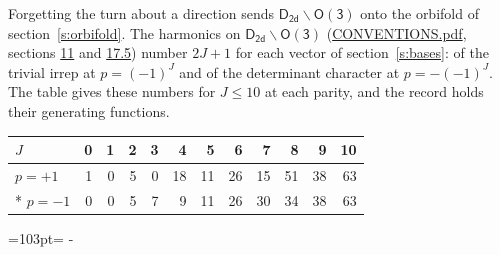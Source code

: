 \documentclass[10pt,a4paper]{article}
\newcommand{\needspace}[1]{\par\penalty-100\begingroup\dimen0=#1\relax\dimen2=\pagegoal
  \advance\dimen2-\pagetotal\ifdim\dimen0>\dimen2\relax\ifdim\dimen2>0pt\vfil\break\fi\fi
  \endgroup}
\numberwithin{equation}{section}
\newcommand{\grp}[1]{\mathsf{#1}}
\begin{document}
Forgetting the turn about a direction sends $\grp{D_{2d}}\backslash\grp{O(3)}$ onto the orbifold of section~\ref{s:orbifold}.
The harmonics on $\grp{D_{2d}}\backslash\grp{O(3)}$ (\href{../../CONVENTIONS.pdf}{CONVENTIONS.pdf}, sections \href{../../CONVENTIONS.pdf\#conv.11}{11} and \href{../../CONVENTIONS.pdf\#conv.17.5}{17.5}) number $2J + 1$ for each vector of section~\ref{s:bases}: of the trivial irrep at $p = (-1)^J$ and of the determinant character at $p = -(-1)^J$. The table gives these numbers for $J \le 10$ at each parity, and the record holds their generating functions.
{\small\setlength{\tabcolsep}{4pt}\begin{longtable}{@{}lrrrrrrrrrrr@{}}\toprule
$J$ & 0 & 1 & 2 & 3 & 4 & 5 & 6 & 7 & 8 & 9 & 10\\\midrule\endhead
\bottomrule\endfoot\endlastfoot
$p = +1$ & 1 & 0 & 5 & 0 & 18 & 11 & 26 & 15 & 51 & 38 & 63\\*
$p = -1$ & 0 & 0 & 5 & 7 & 9 & 11 & 26 & 30 & 34 & 38 & 63\\
\bottomrule\end{longtable}}
\needspace{103pt}
\end{document}
